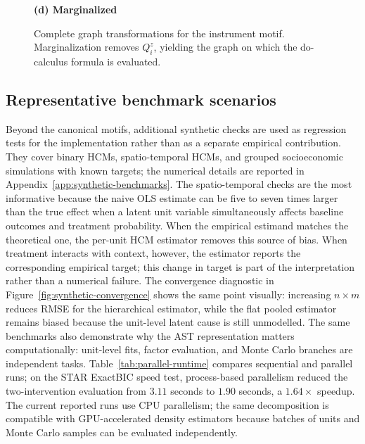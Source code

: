 \documentclass[unnumsec,webpdf,contemporary,large]{oup-authoring-template}%
\renewcommand{\plate}[4][]{\node[draw, rounded corners, fit=#3, inner sep=4pt, #1] (#2) {};\node[anchor=south east, inner sep=2pt] at (#2.south east) {#4};}
\theoremstyle{thmstyleone}%
\theoremstyle{thmstyletwo}%
\theoremstyle{thmstylethree}%
\begin{document}
\begin{figure}[!htbp]
\begin{minipage}[t]{0.22\textwidth}
\centering
\textbf{(d) Marginalized}\par\medskip
{}
\end{minipage}
\caption{Complete graph transformations for the instrument motif. Marginalization removes $Q^z_i$, yielding the graph on which the do-calculus formula is evaluated.}
\label{fig:complete-instrument}
\end{figure}

\subsection{Representative benchmark scenarios}

Beyond the canonical motifs, additional synthetic checks are used as regression tests for the implementation rather than as a separate empirical contribution.
They cover binary HCMs, spatio-temporal HCMs, and grouped socioeconomic simulations with known targets; the numerical details are reported in Appendix~\ref{app:synthetic-benchmarks}.
The spatio-temporal checks are the most informative because the naive OLS estimate can be five to seven times larger than the true effect when a latent unit variable simultaneously affects baseline outcomes and treatment probability.
When the empirical estimand matches the theoretical one, the per-unit HCM estimator removes this source of bias.
When treatment interacts with context, however, the estimator reports the corresponding empirical target; this change in target is part of the interpretation rather than a numerical failure.
The convergence diagnostic in Figure~\ref{fig:synthetic-convergence} shows the same point visually: increasing $n\times m$ reduces RMSE for the hierarchical estimator, while the flat pooled estimator remains biased because the unit-level latent cause is still unmodelled.
The same benchmarks also demonstrate why the AST representation matters computationally: unit-level fits, factor evaluation, and Monte Carlo branches are independent tasks. Table~\ref{tab:parallel-runtime} compares sequential and parallel runs; on the STAR ExactBIC speed test, process-based parallelism reduced the two-intervention evaluation from $3.11$ seconds to $1.90$ seconds, a $1.64\times$ speedup. The current reported runs use CPU parallelism; the same decomposition is compatible with GPU-accelerated density estimators because batches of units and Monte Carlo samples can be evaluated independently.
\end{document}
